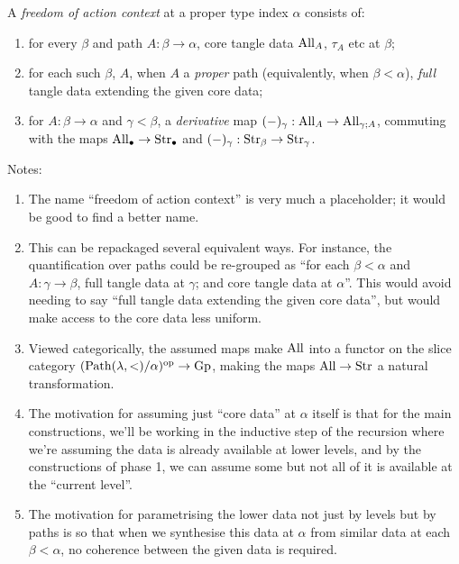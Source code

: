 \begin{definition}
  \label{def:foa-context}
  A \emph{freedom of action context} at a proper type index $\alpha$ consists of:

  \begin{enumerate}
  \item for every $\beta$ and path $A : \beta \to \alpha$, core tangle data $\mathrm{All}_A$, $\tau_A$ etc at $\beta$;
  \item for each such $\beta$, $A$, when $A$ a \emph{proper} path (equivalently, when $\beta < \alpha$), \emph{full} tangle data extending the given core data;
  \item for $A : \beta \to \alpha$ and $\gamma < \beta$, a \emph{derivative} map $(-)_\gamma : \mathrm{All}_{A} \to \mathrm{All}_{\gamma;A}$, commuting with the maps $\mathrm{All}_\bullet \to \mathrm{Str}_\bullet$ and $(-)_{\gamma} : \mathrm{Str}_\beta \to \mathrm{Str}_\gamma$.
  \end{enumerate}

  Notes:
  \begin{enumerate}
  \item The name “freedom of action context” is very much a placeholder; it would be good to find a better name.
  \item This can be repackaged several equivalent ways.  For instance, the quantification over paths could be re-grouped as “for each $\beta < \alpha$ and $A : \gamma \to \beta$, full tangle data at $\gamma$; and core tangle data at $\alpha$”.  This would avoid needing to say “full tangle data extending the given core data”, but would make access to the core data less uniform.
  \item Viewed categorically, the assumed maps make $\mathrm{All}$ into a functor on the slice category $(\mathrm{Path} (\lambda,<)/\alpha)^{\mathrm{op}} \to \mathrm{Gp}$, making the maps $\mathrm{All} \to \mathrm{Str}$ a natural transformation.
  \item The motivation for assuming just “core data” at $\alpha$ itself is that for the main constructions, we’ll be working in the inductive step of the recursion where we’re assuming the data is already available at lower levels, and by the constructions of phase 1, we can assume some but not all of it is available at the “current level”.
  \item The motivation for parametrising the lower data not just by levels but by paths is so that when we synthesise this data at $\alpha$ from similar data at each $\beta < \alpha$, no coherence between the given data is required.
  \end{enumerate}
\end{definition}

